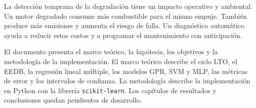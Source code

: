 La detección temprana de la degradación tiene un impacto operativo y ambiental. Un motor degradado consume más combustible para el mismo empuje. También produce más emisiones y aumenta el riesgo de falla. Un diagnóstico automático ayuda a reducir estos costos y a programar el mantenimiento con anticipación.

El documento presenta el marco teórico, la hipótesis, los objetivos y la metodología de la implementación. El marco teórico describe el ciclo LTO, el EEDB, la regresión lineal múltiple, los modelos GPR, SVM y MLP, las métricas de error y los intervalos de confianza. La metodología describe la implementación en Python con la librería \texttt{scikit-learn}. Los capítulos de resultados y conclusiones quedan pendientes de desarrollo.
